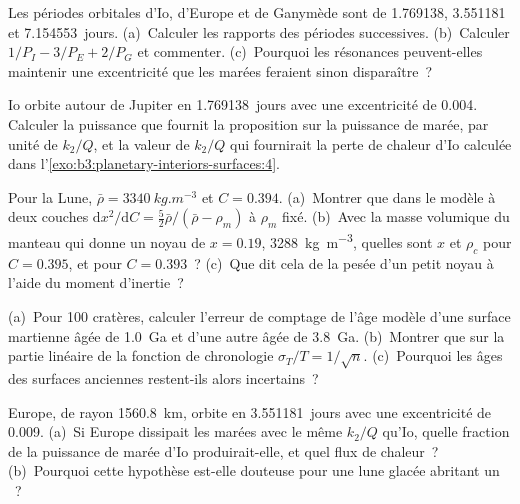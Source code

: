 \begin{exercise}[$\star\star$]\label{exo:b3:planetary-interiors-surfaces:8}
Les périodes orbitales d'Io, d'Europe et de Ganymède sont de 1.769138, 3.551181 et
\num{7.154553}~jours. (a)~Calculer les rapports des périodes successives.
(b)~Calculer $1/P_I - 3/P_E + 2/P_G$ et commenter. (c)~Pourquoi les résonances peuvent-elles
maintenir une excentricité que les marées feraient sinon disparaître~?
\end{exercise}

\begin{exercise}[$\star\star$]\label{exo:b3:planetary-interiors-surfaces:9}
Io orbite autour de Jupiter en \num{1.769138}~jours avec une excentricité de 0.004.
Calculer la puissance que fournit la proposition sur la puissance de marée, par unité de $k_2/Q$,
et la valeur de $k_2/Q$ qui fournirait la perte de chaleur
d'Io calculée dans l'\cref{exo:b3:planetary-interiors-surfaces:4}.
\end{exercise}

\begin{exercise}[$\star\star\star$]\label{exo:b3:planetary-interiors-surfaces:10}
Pour la Lune, $\bar\rho = \qty{3340}{kg.m^{-3}}$ et $C = 0.394$.
(a)~Montrer que dans le modèle à deux couches $\mathrm dx^2/\mathrm dC =
\tfrac52\bar\rho/(\bar\rho - \rho_m)$ à $\rho_m$ fixé. (b)~Avec la
masse volumique du manteau qui donne un noyau de $x = 0.19$, \qty{3288}{kg.m^{-3}},
quelles sont $x$ et $\rho_c$ pour $C = 0.395$, et pour $C = 0.393$~?
(c)~Que dit cela de la pesée d'un petit noyau à l'aide du moment
d'inertie~?
\end{exercise}

\begin{exercise}[$\star\star\star$]\label{exo:b3:planetary-interiors-surfaces:11}
(a)~Pour 100 cratères, calculer l'erreur de comptage de l'âge modèle
d'une surface martienne âgée de \qty{1.0}{Ga} et d'une autre âgée de \qty{3.8}{Ga}.
(b)~Montrer que sur la partie linéaire de la fonction de chronologie $\sigma_T/T =
1/\sqrt n$. (c)~Pourquoi les âges des surfaces anciennes restent-ils alors incertains~?
\end{exercise}

\begin{exercise}[$\star\star\star$]\label{exo:b3:planetary-interiors-surfaces:12}
Europe, de rayon \qty{1560.8}{km}, orbite en \num{3.551181}~jours avec
une excentricité de 0.009. (a)~Si Europe dissipait les marées avec le même $k_2/Q$
qu'Io, quelle fraction de la puissance de marée d'Io produirait-elle, et quel flux de chaleur~?
(b)~Pourquoi cette hypothèse est-elle douteuse pour une lune glacée abritant un ~?
\end{exercise}


